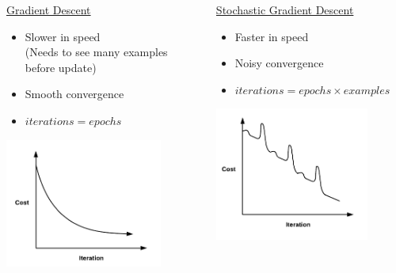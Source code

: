 \documentclass{beamer}
\begin{document}
	\begin{frame}{}
	\begin{columns}
	\begin{column}{0.5\textwidth}{\underline{Gradient Descent}}
		\begin{itemize}
			\item Slower in speed\\ (Needs to see many examples before update)
			\item Smooth convergence
			\item $iterations = epochs$
		\end{itemize}
		\vspace{0.5cm}
		\centering
		\includegraphics[width = 0.8\textwidth]{sgd-gd/imgs/gd-cost-iter-curve}
	\end{column}
	
	\begin{column}{0.5\textwidth}{\underline{Stochastic Gradient Descent}}
		\begin{itemize}
			\item Faster in speed
			\vspace{0.5cm}
			\item Noisy convergence
			\item $iterations = epochs \times examples$
		\end{itemize}
		\vspace{0.5cm}
		\centering
		\includegraphics[width = 0.8\textwidth]{sgd-gd/imgs/sgd-cost-iter-curve}
	\end{column}
\end{columns}
\end{frame}
\end{document}
